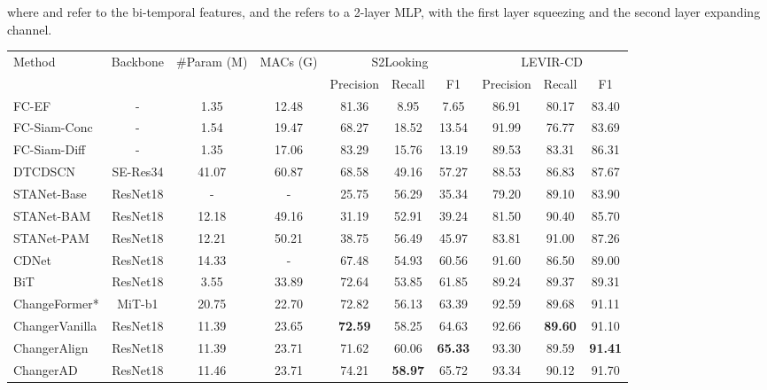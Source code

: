 \documentclass[10pt,twocolumn,letterpaper]{article}
\begin{document}
where  and  refer to the bi-temporal features, and the  refers to a 2-layer MLP, with the first layer squeezing and the second layer expanding channel.


\begin{table*}
  \centering
  \begin{tabular}{@{}l|c|c|c|ccc|ccc@{}}
    \toprule[1pt]
    \multirow{2}{*}{Method} & \multirow{2}{*}{Backbone} & \multirow{2}{*}{\#Param (M)} & \multirow{2}{*}{MACs (G)} & \multicolumn{3}{c|}{S2Looking} & \multicolumn{3}{c}{LEVIR-CD}\\
    & & & & Precision & Recall & F1 & Precision & Recall & F1\\
    \midrule
    FC-EF \cite{daudt2018fully} & - & 1.35 & 12.48 & 81.36 & 8.95 & 7.65 & 86.91 & 80.17 & 83.40\\
    FC-Siam-Conc \cite{daudt2018fully} & - & 1.54 & 19.47 & 68.27 & 18.52 & 13.54 & 91.99 & 76.77 & 83.69\\
    FC-Siam-Diff \cite{daudt2018fully} & - & 1.35 & 17.06 & 83.29 & 15.76 & 13.19 & 89.53 & 83.31 & 86.31\\
    DTCDSCN \cite{liu2020building} & SE-Res34 & 41.07 & 60.87 & 68.58 & 49.16 & 57.27 & 88.53 & 86.83 & 87.67\\
    STANet-Base \cite{chen2020spatial} & ResNet18 & - & - & 25.75 & 56.29 & 35.34 & 79.20 & 89.10 & 83.90\\
    STANet-BAM \cite{chen2020spatial} & ResNet18 & 12.18 & 49.16 & 31.19 & 52.91 & 39.24 & 81.50 & 90.40 & 85.70\\
    STANet-PAM \cite{chen2020spatial} & ResNet18 & 12.21 & 50.21 & 38.75 & 56.49 & 45.97 & 83.81 & 91.00 & 87.26\\
    CDNet \cite{chen2021adversarial}& ResNet18 & 14.33 & - & 67.48 & 54.93 & 60.56 & 91.60 & 86.50 & 89.00\\
    BiT \cite{chen2021efficient} & ResNet18 & 3.55 & 33.89 & 72.64 & 53.85 & 61.85 & 89.24 & 89.37 & 89.31\\
    ChangeFormer* \cite{bandara2022transformerbased}& MiT-b1 & 20.75 & 22.70 & 72.82 & 56.13 & 63.39 & 92.59 & 89.68 & 91.11\\
    \hline
    \hline
    ChangerVanilla & ResNet18 & 11.39 & 23.65 & \textbf{72.59} & 58.25 & 64.63 & 92.66 & \textbf{89.60} & 91.10\\
    ChangerAlign & ResNet18 & 11.39 & 23.71 & 71.62 & {\color{blue} 60.06} & \textbf{65.33} & {\color{blue} 93.30} & 89.59 & \textbf{91.41}\\
    ChangerAD & ResNet18 & 11.46 & 23.71 & {\color{red} 74.21} & \textbf{58.97} & {\color{blue} 65.72} & {\color{red} 93.34} & {\color{blue} 90.12} & {\color{blue} 91.70}\\

\end{tabular}
\end{table*}
\end{document}
